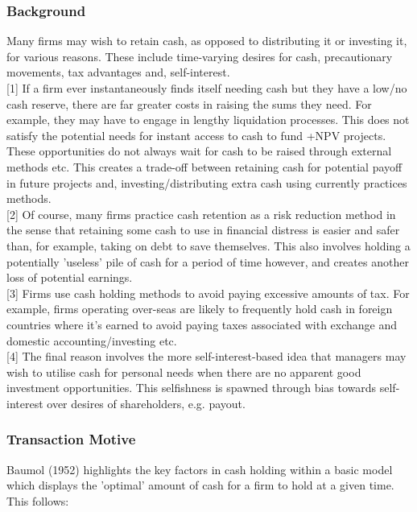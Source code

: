 \documentclass[11pt, english]{article}
\begin{document}
		\subsubsection*{Background}

	Many firms may wish to retain cash, as opposed to distributing it or investing it, for various reasons. These include time-varying desires for cash, precautionary movements, tax advantages and, self-interest.\\

	[1] If a firm ever instantaneously finds itself needing cash but they have a low/no cash reserve, there are far greater costs in raising the sums they need. For example, they may have to engage in lengthy liquidation processes. This does not satisfy the potential needs for instant access to cash to fund +NPV projects. These opportunities do not always wait for cash to be raised through external methods etc. This creates a trade-off between retaining cash for potential payoff in future projects and, investing/distributing extra cash using currently practices methods.\\

	[2] Of course, many firms practice cash retention as a risk reduction method in the sense that retaining some cash to use in financial distress is easier and safer than, for example, taking on debt to save themselves. This also involves holding a potentially 'useless' pile of cash for a period of time however, and creates another loss of potential earnings.\\

	[3] Firms use cash holding methods to avoid paying excessive amounts of tax. For example, firms operating over-seas are likely to frequently hold cash in foreign countries where it's earned to avoid paying taxes associated with exchange and domestic accounting/investing etc.\\

	[4] The final reason involves the more self-interest-based idea that managers may wish to utilise cash for personal needs when there are no apparent good investment opportunities. This selfishness is spawned through bias towards self-interest over desires of shareholders, e.g. payout.

		\subsubsection*{Transaction Motive}

	Baumol (1952) highlights the key factors in cash holding within a basic model which displays the 'optimal' amount of cash for a firm to hold at a given time. This follows:
\end{document}
